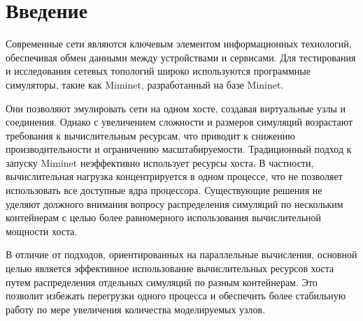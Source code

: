 
\section*{Введение}
\thispagestyle{withCompileDate}
Современные сети являются ключевым элементом информационных технологий, обеспечивая обмен данными между устройствами и сервисами.
Для тестирования и исследования сетевых топологий широко используются программные симуляторы, такие как Miminet\cite{miminet}, разработанный на базе Mininet\cite{mininet}.

Они позволяют эмулировать сети на одном хосте, создавая виртуальные узлы и соединения.
Однако с увеличением сложности и размеров симуляций возрастают требования к вычислительным ресурсам, что приводит к снижению производительности и ограничению масштабируемости.
Традиционный подход к запуску Miminet неэффективно использует ресурсы хоста.
В частности, вычислительная нагрузка концентрируется в одном процессе, что не позволяет использовать все доступные ядра процессора.
Существующие решения не уделяют должного внимания вопросу распределения симуляций по нескольким контейнерам с целью более равномерного использования вычислительной мощности хоста.

В отличие от подходов, ориентированных на параллельные вычисления, основной целью является эффективное использование вычислительных ресурсов хоста путем распределения отдельных симуляций по разным контейнерам.
Это позволит избежать перегрузки одного процесса и обеспечить более стабильную работу по мере увеличения количества моделируемых узлов.
